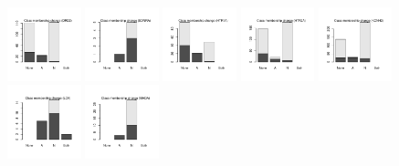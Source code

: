 \documentclass[utf8]{frontiersSCNS} %
\begin{document}
\begin{figure}[h!]
\includegraphics[width=0.19\textwidth]{figures/validation_plots/drd2_0p8_valplot.pdf}
\includegraphics[width=0.19\textwidth]{figures/validation_plots/ednra_0p8_valplot.pdf}
\includegraphics[width=0.19\textwidth]{figures/validation_plots/htr1a_0p8_valplot.pdf}
\includegraphics[width=0.19\textwidth]{figures/validation_plots/htr2a_0p8_valplot.pdf}
\includegraphics[width=0.19\textwidth]{figures/validation_plots/kcnh2_0p8_valplot.pdf}
\includegraphics[width=0.19\textwidth]{figures/validation_plots/lck_0p8_valplot.pdf}
\includegraphics[width=0.19\textwidth]{figures/validation_plots/maoa_0p8_valplot.pdf}

\end{figure}
\end{document}
